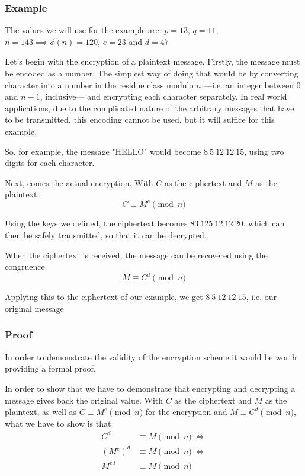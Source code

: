 \documentclass[12pt, titlepage]{article}
\begin{document}
        \subsubsection{Example}
        The values we will use for the example are: $p=13$, $q=11$, $n=143 \implies \phi (n) =
        120$, $e = 23$ and $d = 47$

        Let's begin with the encryption of a plaintext message. Firstly, the message must be
        encoded as a number. The simplest way of doing that would be by converting character
        into a number in the residue class modulo $n$ ---i.e. an integer between $0$ and
        $n-1$, inclusive--- and encrypting each character separately.  In real world
        applications, due to the complicated nature of the arbitrary messages that have to
        be transmitted, this encoding cannot be used, but it will suffice for this example.

        So, for example, the message "HELLO" would become $8\ 5\ 12\ 12\ 15$, using two digits
        for each character.

        Next, comes the actual encryption. With $C$ as the ciphertext and $M$ as the plaintext:
        \begin{equation*}
            C \equiv M^{e} \pmod{n}
        \end{equation*}

        Using the keys we defined, the ciphertext becomes $83\ 125\ 12\ 12\ 20$, which can then
        be safely transmitted, so that it can be decrypted.   

        When the ciphertext is received, the message can be recovered using the congruence
        \begin{equation*}
            M \equiv C^{d} \pmod{n}
        \end{equation*}

        Applying this to the ciphertext of our example, we get $8\ 5\ 12\ 12\ 15$, i.e. our
        original message

    
        \subsubsection{Proof}
        In order to demonstrate the validity of the encryption scheme it would be worth
        providing a formal proof. \autocite{so_rsa_proof}

        In order to show that we have to demonstrate that encrypting and decrypting a
        message gives back the original value. With $C$ as the ciphertext and $M$ as the
        plaintext, as well as $C \equiv M^e \pmod{n}$ for the encryption and $M \equiv C^d
        \pmod{n}$, what we have to show is that
        \begin{align*}
            C^d     &\equiv M \pmod{n}\ \iff \\
            (M^e)^d &\equiv M \pmod{n}\ \iff \\
            M^{ed}  &\equiv M \pmod{n}
        \end{align*}
\end{document}
